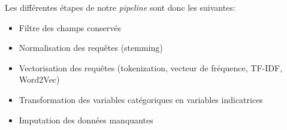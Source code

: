 Les différentes étapes de notre \emph{pipeline} sont donc les suivantes:
\begin{itemize}
	\item Filtre des champs conservés
	\item Normalisation des requêtes (stemming)
	\item Vectorisation des requêtes (tokenization, vecteur de fréquence, TF-IDF, Word2Vec)
	\item Transformation des variables catégoriques en variables indicatrices
	\item Imputation des données manquantes
\end{itemize}
	

